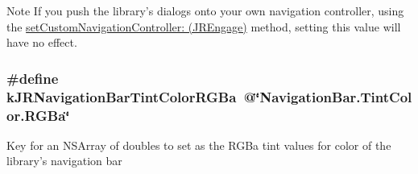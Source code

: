 \begin{DoxyNote}{Note}
If you push the library's dialogs onto your own navigation controller, using the \hyperlink{interface_j_r_engage_a6c704bbff377d20603e6b52bd0ae17f1}{setCustomNavigationController: (JREngage)} method, setting this value will have no effect. 
\end{DoxyNote}
\hypertarget{group__custom_interface_gabda4f66c5cde44bbeaa6a993f4793ac5}{
\subsubsection[{kJRNavigationBarTintColorRGBa}]{\setlength{\rightskip}{0pt plus 5cm}\#define kJRNavigationBarTintColorRGBa~@\char`\"{}NavigationBar.TintColor.RGBa\char`\"{}}}
\label{group__custom_interface_gabda4f66c5cde44bbeaa6a993f4793ac5}
Key for an {\ttfamily NSArray} of doubles to set as the RGBa tint values for color of the library's navigation bar

